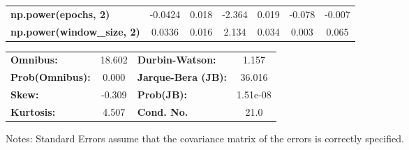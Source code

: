 \begin{center}
\begin{tabular}{lcccccc}
\textbf{np.power(epochs, 2)}         &      -0.0424  &        0.018     &    -2.364  &         0.019        &       -0.078    &       -0.007     \\
\textbf{np.power(window\_size, 2)}   &       0.0336  &        0.016     &     2.134  &         0.034        &        0.003    &        0.065     \\
\bottomrule
\end{tabular}
\begin{tabular}{lclc}
\textbf{Omnibus:}       & 18.602 & \textbf{  Durbin-Watson:     } &    1.157  \\
\textbf{Prob(Omnibus):} &  0.000 & \textbf{  Jarque-Bera (JB):  } &   36.016  \\
\textbf{Skew:}          & -0.309 & \textbf{  Prob(JB):          } & 1.51e-08  \\
\textbf{Kurtosis:}      &  4.507 & \textbf{  Cond. No.          } &     21.0  \\
\bottomrule
\end{tabular}
\end{center}

Notes: \newline
 [1] Standard Errors assume that the covariance matrix of the errors is correctly specified.